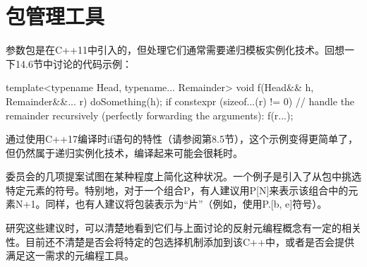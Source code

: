 \section{包管理工具}
参数包是在C++11中引入的，但处理它们通常需要递归模板实例化技术。回想一下14.6节中讨论的代码示例：

\begin{cpp}
template<typename Head, typename... Remainder>
void f(Head&& h, Remainder&&... r) {
	doSomething(h);
	if constexpr (sizeof...(r) != 0) {
		// handle the remainder recursively (perfectly forwarding the arguments):
		f(r...);
	}
}
\end{cpp}

通过使用C++17编译时if语句的特性（请参阅第8.5节），这个示例变得更简单了，但仍然属于递归实例化技术，编译起来可能会很耗时。

委员会的几项提案试图在某种程度上简化这种状况。一个例子是引入了从包中挑选特定元素的符号。特别地，对于一个组合P，有人建议用P[N]来表示该组合中的元素N+1。同样，也有人建议将包装表示为“片”（例如，使用P.[b, e]符号）。

研究这些建议时，可以清楚地看到它们与上面讨论的反射元编程概念有一定的相关性。目前还不清楚是否会将特定的包选择机制添加到该C++中，或者是否会提供满足这一需求的元编程工具。




















































